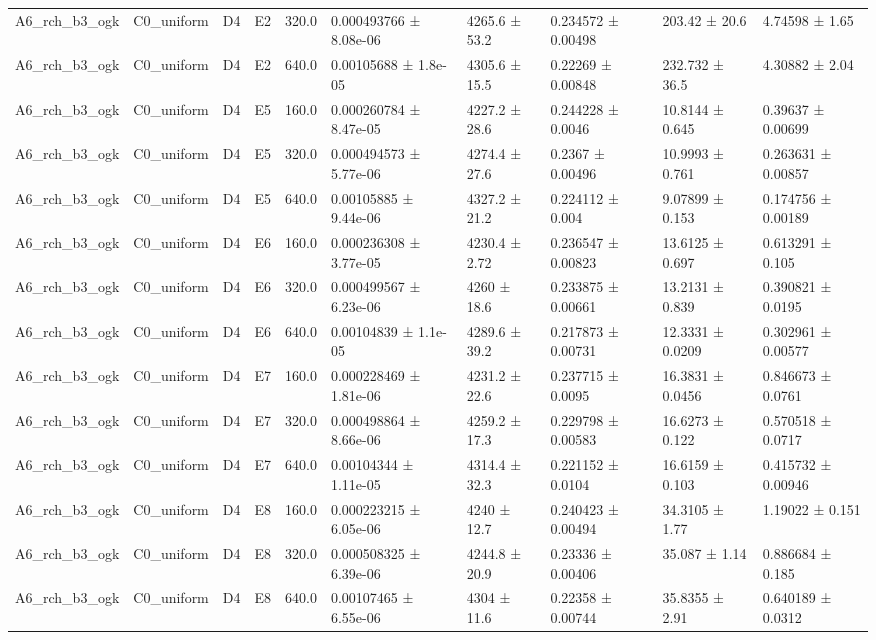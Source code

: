 \begin{table}
\begin{tabular}{llllllllll}
A6\_rch\_b3\_ogk & C0\_uniform & D4 & E2 & 320.0 & 0.000493766 ± 8.08e-06 & 4265.6 ± 53.2 & 0.234572 ± 0.00498 & 203.42 ± 20.6 & 4.74598 ± 1.65 \\
A6\_rch\_b3\_ogk & C0\_uniform & D4 & E2 & 640.0 & 0.00105688 ± 1.8e-05 & 4305.6 ± 15.5 & 0.22269 ± 0.00848 & 232.732 ± 36.5 & 4.30882 ± 2.04 \\
A6\_rch\_b3\_ogk & C0\_uniform & D4 & E5 & 160.0 & 0.000260784 ± 8.47e-05 & 4227.2 ± 28.6 & 0.244228 ± 0.0046 & 10.8144 ± 0.645 & 0.39637 ± 0.00699 \\
A6\_rch\_b3\_ogk & C0\_uniform & D4 & E5 & 320.0 & 0.000494573 ± 5.77e-06 & 4274.4 ± 27.6 & 0.2367 ± 0.00496 & 10.9993 ± 0.761 & 0.263631 ± 0.00857 \\
A6\_rch\_b3\_ogk & C0\_uniform & D4 & E5 & 640.0 & 0.00105885 ± 9.44e-06 & 4327.2 ± 21.2 & 0.224112 ± 0.004 & 9.07899 ± 0.153 & 0.174756 ± 0.00189 \\
A6\_rch\_b3\_ogk & C0\_uniform & D4 & E6 & 160.0 & 0.000236308 ± 3.77e-05 & 4230.4 ± 2.72 & 0.236547 ± 0.00823 & 13.6125 ± 0.697 & 0.613291 ± 0.105 \\
A6\_rch\_b3\_ogk & C0\_uniform & D4 & E6 & 320.0 & 0.000499567 ± 6.23e-06 & 4260 ± 18.6 & 0.233875 ± 0.00661 & 13.2131 ± 0.839 & 0.390821 ± 0.0195 \\
A6\_rch\_b3\_ogk & C0\_uniform & D4 & E6 & 640.0 & 0.00104839 ± 1.1e-05 & 4289.6 ± 39.2 & 0.217873 ± 0.00731 & 12.3331 ± 0.0209 & 0.302961 ± 0.00577 \\
A6\_rch\_b3\_ogk & C0\_uniform & D4 & E7 & 160.0 & 0.000228469 ± 1.81e-06 & 4231.2 ± 22.6 & 0.237715 ± 0.0095 & 16.3831 ± 0.0456 & 0.846673 ± 0.0761 \\
A6\_rch\_b3\_ogk & C0\_uniform & D4 & E7 & 320.0 & 0.000498864 ± 8.66e-06 & 4259.2 ± 17.3 & 0.229798 ± 0.00583 & 16.6273 ± 0.122 & 0.570518 ± 0.0717 \\
A6\_rch\_b3\_ogk & C0\_uniform & D4 & E7 & 640.0 & 0.00104344 ± 1.11e-05 & 4314.4 ± 32.3 & 0.221152 ± 0.0104 & 16.6159 ± 0.103 & 0.415732 ± 0.00946 \\
A6\_rch\_b3\_ogk & C0\_uniform & D4 & E8 & 160.0 & 0.000223215 ± 6.05e-06 & 4240 ± 12.7 & 0.240423 ± 0.00494 & 34.3105 ± 1.77 & 1.19022 ± 0.151 \\
A6\_rch\_b3\_ogk & C0\_uniform & D4 & E8 & 320.0 & 0.000508325 ± 6.39e-06 & 4244.8 ± 20.9 & 0.23336 ± 0.00406 & 35.087 ± 1.14 & 0.886684 ± 0.185 \\
A6\_rch\_b3\_ogk & C0\_uniform & D4 & E8 & 640.0 & 0.00107465 ± 6.55e-06 & 4304 ± 11.6 & 0.22358 ± 0.00744 & 35.8355 ± 2.91 & 0.640189 ± 0.0312 \\

\end{tabular}
\end{table}
